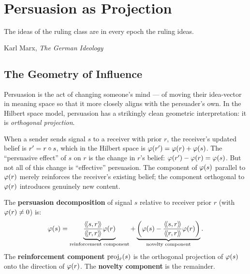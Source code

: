 \chapter{Persuasion as Projection}
\label{ch:persuasion}

\epigraph{The ideas of the ruling class are in every epoch the ruling ideas.}
{Karl Marx, \textit{The German Ideology}}

\section{The Geometry of Influence}

Persuasion is the act of changing someone's mind --- of moving their idea-vector
in meaning space so that it more closely aligns with the persuader's own. In the
Hilbert space model, persuasion has a strikingly clean geometric interpretation:
it is \emph{orthogonal projection}.

When a sender sends signal $s$ to a receiver with prior $r$, the receiver's
updated belief is $r' = r \circ s$, which in the Hilbert space is
$\varphi(r') = \varphi(r) + \varphi(s)$. The ``persuasive effect'' of $s$ on $r$
is the change in $r$'s belief: $\varphi(r') - \varphi(r) = \varphi(s)$. But not
all of this change is ``effective'' persuasion. The component of $\varphi(s)$
parallel to $\varphi(r)$ merely reinforces the receiver's existing belief; the
component orthogonal to $\varphi(r)$ introduces genuinely new content.

\begin{definition}
\label{def:persuasion-decomposition}
The \textbf{persuasion decomposition} of signal $s$ relative to receiver prior
$r$ (with $\varphi(r) \neq 0$) is:
\[
  \embed{s} = \underbrace{\frac{\rs{s}{r}}{\rs{r}{r}} \embed{r}}_{
  \text{reinforcement component}} +
  \underbrace{\left(\embed{s} - \frac{\rs{s}{r}}{\rs{r}{r}}
  \embed{r}\right)}_{\text{novelty component}}.
\]
The \textbf{reinforcement component} $\operatorname{proj}_{\hat{r}}\!\left(s\right)$ is the orthogonal
projection of $\varphi(s)$ onto the direction of $\varphi(r)$. The
\textbf{novelty component} is the remainder.
\end{definition}

